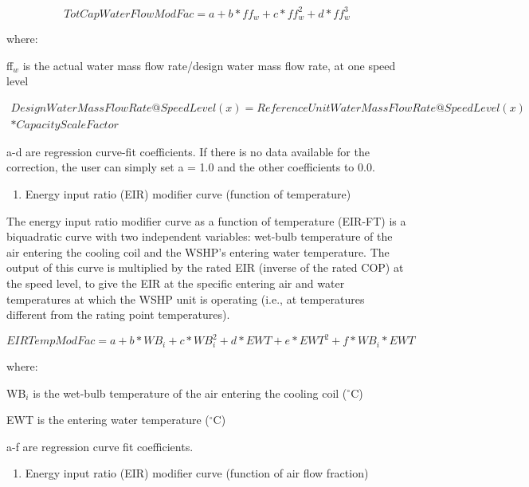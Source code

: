 \begin{equation}
TotCapWaterFlowModFac = a + b*f{f_w} + c*ff_w^2 + d*ff_w^3
\end{equation}

where:

ff\(_{w}\) is the actual water mass flow rate/design water mass flow rate, at one speed level

\begin{equation}
\begin{split}
  DesignWaterMassFlowRate@SpeedLevel(x) = ReferenceUnitWaterMassFlowRate@SpeedLevel(x) \\
  * CapacityScaleFactor
\end{split}
\end{equation}

a-d are regression curve-fit coefficients.  If there is no data available for the correction, the user can simply set a = 1.0 and the other coefficients to 0.0.

\begin{enumerate}
\def\labelenumi{\arabic{enumi})}
\setcounter{enumi}{3}
\tightlist
\item
  Energy input ratio (EIR) modifier curve (function of temperature)
\end{enumerate}

The energy input ratio modifier curve as a function of temperature (EIR-FT) is a biquadratic curve with two independent variables: wet-bulb temperature of the air entering the cooling coil and the WSHP's entering water temperature. The output of this curve is multiplied by the rated EIR (inverse of the rated COP) at the speed level, to give the EIR at the specific entering air and water temperatures at which the WSHP unit is operating (i.e., at temperatures different from the rating point temperatures).

\begin{equation}
EIRTempModFac = a + b*W{B_i} + c*WB_i^2 + d*EWT + e*EW{T^2} + f*W{B_i}*EWT
\end{equation}

where:

WB\(_{i}\) is the wet-bulb temperature of the air entering the cooling coil (\(^{\circ}\)C)

EWT is the entering water temperature (\(^{\circ}\)C)

a-f are regression curve fit coefficients.

\begin{enumerate}
\def\labelenumi{\arabic{enumi})}
\setcounter{enumi}{4}
\tightlist
\item
  Energy input ratio (EIR) modifier curve (function of air flow fraction)
\end{enumerate}

